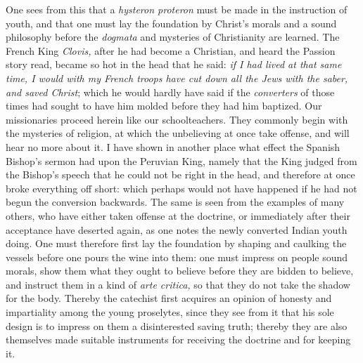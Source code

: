 \documentclass[12pt,a4paper,openany]{book}
\newcommand{\opage}[1]{\marginnote{\footnotesize\textit{[#1]}}}
\begin{document}
One sees from this that a \textit{hysteron proteron} must be made in the
instruction of youth, and that one must lay the foundation by Christ's morals and
a sound philosophy before the \textit{dogmata} and mysteries of Christianity are
learned. The French King \textit{Clovis,} after he had become a Christian, and
heard the Passion story read, became so hot in the head that he said: \emph{if
I had lived at that same time, I would with my French troops have cut down
all the Jews with the saber, and saved Christ}; which he would hardly have said
if the \textit{converters} of those times had sought to have him molded before
they had him baptized. %
Our missionaries proceed herein like our schoolteachers.
They commonly begin with the mysteries of religion, at which the unbelieving at
once take offense, and will hear no more about it. I have shown in another place
what effect the Spanish Bishop's sermon had upon the Peruvian King, namely that
the King judged from the Bishop's speech that he could not be right in the head,
and therefore at once broke everything off short: which perhaps would not have
happened if he had not begun the conversion backwards. The same is seen from the
examples of many others, who have either taken offense at
\setcounter{footnote}{0}%
\opage{19}the doctrine, or immediately after their acceptance have deserted again, as one
notes the newly converted Indian youth doing. One must therefore first lay the
foundation by shaping and caulking the vessels before one pours the wine into
them: one must impress on people sound morals, show them what they ought to
believe before they are bidden to believe, and instruct them in a kind of
\textit{arte critica,} so that they do not take the shadow for the body. Thereby
the catechist first acquires an opinion of honesty and impartiality among the
young proselytes, since they see from it that his sole design is to impress on
them a disinterested saving truth; thereby they are also themselves made suitable
instruments for receiving the doctrine and for keeping it.
\end{document}
